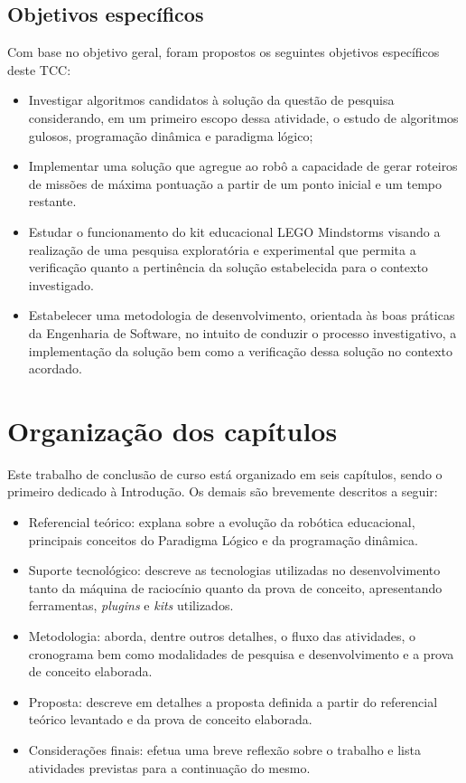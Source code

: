 \subsection{Objetivos específicos}
Com base no objetivo geral, foram propostos os seguintes objetivos específicos deste TCC:
\begin{itemize}
\item Investigar algoritmos candidatos à solução da questão de pesquisa considerando, em um primeiro escopo dessa atividade, o estudo de algoritmos gulosos, programação dinâmica e paradigma lógico;
\item Implementar uma solução que agregue ao robô a capacidade de gerar roteiros de missões de máxima pontuação a partir de um ponto inicial e um tempo restante.
\item Estudar o funcionamento do kit educacional LEGO Mindstorms visando a realização de uma pesquisa exploratória e experimental que permita a verificação quanto a pertinência da solução estabelecida para o contexto investigado.
\item Estabelecer uma metodologia de desenvolvimento, orientada às boas práticas da Engenharia de Software, no intuito de conduzir o processo investigativo, a implementação da solução bem como a verificação dessa solução no contexto acordado.
\end{itemize}

\section{Organização dos capítulos}
Este trabalho de conclusão de curso está organizado em seis capítulos, sendo o primeiro dedicado à Introdução. Os demais são brevemente descritos a seguir:
\begin{itemize}
\item Referencial teórico: explana sobre a evolução da robótica educacional, principais conceitos do Paradigma Lógico e da programação dinâmica. 
\item Suporte tecnológico: descreve as tecnologias utilizadas no desenvolvimento
tanto da máquina de raciocínio quanto da prova de conceito, apresentando ferramentas, \textit{plugins} e \textit{kits} utilizados.
\item Metodologia: aborda, dentre outros detalhes, o fluxo das atividades, o cronograma bem como modalidades de pesquisa e desenvolvimento e a prova de conceito elaborada.
\item Proposta: descreve em detalhes a proposta definida a partir do referencial teórico levantado e da prova de conceito elaborada.
\item Considerações finais: efetua uma breve reflexão sobre o trabalho e lista atividades previstas para a continuação do mesmo.
\end{itemize}


